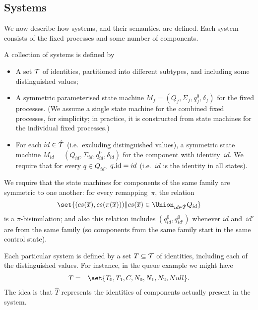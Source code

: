 \subsection{Systems}

We now describe how systems, and their semantics, are defined. 
Each system consists of the fixed processes and some number of components. 
%
\begin{definition}
\label{def:system}
A collection of systems is defined by
%
\begin{itemize}
\item A set $\mathcal{T}$ of identities, partitioned into different subtypes, and
  including some distinguished values;

\item A symmetric parameterised state machine $M_f = (Q_f, \Sigma_f, q_f^0,
  \delta_f)$ for the fixed processes.  (We assume a single state machine for
  the combined fixed processes, for simplicity; in practice, it is constructed
  from state machines for the individual fixed processes.)

\item For each $id \in \hat{\mathcal{T}}$ (i.e.~excluding distinguished values), a
  symmetric state machine $M_{id} = (Q_{id}, \Sigma_{id}, q_{id}^0,
  \delta_{id})$ for the component with identity~$id$.  We require that for
  every $q \in Q_{id}$,\, $q.\mathrm{id} = id$ (i.e.~$id$ is the identity in all
  states).

\end{itemize}

We require that the state machines for components of the same family are
symmetric to one another: for every remapping~$\pi$, the relation
\[
\set{ (cs(\vec{x}), cs(\pi(\vec{x}))) \| 
  cs(\vec{x}) \in \textstyle\Union_{id \in \hat{T}} Q_{id}}
\]
is a $\pi$-bisimulation; and also this relation includes $(q^0_{id},
q^0_{id'})$ whenever $id$ and~$id'$ are from the same family (so components
from the same family start in the same control state).

Each particular system is defined by a set $T \subseteq \mathcal{T}$ of identities,
including each of the distinguished values.  For instance, in the queue
example we might have
%
\begin{eqnarray*}
T & = & \set{T_0, T_1, C, N_0, N_1, N_2, Null}. \\
\end{eqnarray*}
%
The idea is that $\hat{T}$ represents the identities of components actually
present in the system.


\end{definition}
